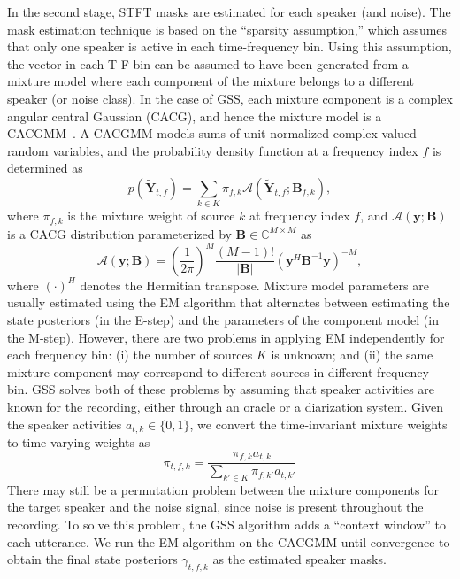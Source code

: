 \documentclass[a4paper]{article}
\begin{document}
In the second stage, STFT masks are estimated for each speaker (and noise). The mask estimation technique is based on the ``sparsity assumption,'' which assumes that only one speaker is active in each time-frequency bin. Using this assumption, the vector in each T-F bin can be assumed to have been generated from a mixture model where each component of the mixture belongs to a different speaker (or noise class). In the case of GSS, each mixture component is a complex angular central Gaussian (CACG), and hence the mixture model is a CACGMM~\cite{Ito2016ComplexAC}. A CACGMM models sums of unit-normalized complex-valued random variables, and the probability density function at a frequency index $f$ is determined as
\begin{equation}
   p(\tilde{\mathbf{Y}}_{t,f}) = \sum_{k\in K} \pi_{f,k} \mathcal{A}(\tilde{\mathbf{Y}}_{t,f};\mathbf{B}_{f,k}),
\end{equation}
where $\pi_{f,k}$ is the mixture weight of source $k$ at frequency index $f$, and $\mathcal{A}(\mathbf{y};\mathbf{B})$ is a CACG distribution parameterized by $\mathbf{B}\in \mathbb{C}^{M\times M}$ as
\begin{equation}
    \mathcal{A}(\mathbf{y};\mathbf{B}) = \left(\frac{1}{2\pi}\right)^M \frac{(M-1)!}{\lvert\mathbf{B}\rvert} (\mathbf{y}^H \mathbf{B}^{-1} \mathbf{y})^{-M},
\end{equation}
where $(\cdot)^H$ denotes the Hermitian transpose. Mixture model parameters are usually estimated using the EM algorithm that alternates between estimating the state posteriors (in the E-step) and the parameters of the component model (in the M-step). However, there are two problems in applying EM independently for each frequency bin: (i) the number of sources $K$ is unknown; and (ii) the same mixture component may correspond to different sources in different frequency bin. GSS solves both of these problems by assuming that speaker activities are known for the recording, either through an oracle or a diarization system. Given the speaker activities $a_{t,k} \in \{0,1\}$, we convert the time-invariant mixture weights to time-varying weights as
\begin{equation}
    \pi_{t,f,k} = \frac{\pi_{f,k}a_{t,k}}{\sum_{k' \in K}\pi_{f,k'}a_{t,k'}}
\end{equation}
There may still be a permutation problem between the mixture components for the target speaker and the noise signal, since noise is present throughout the recording. To solve this problem, the GSS algorithm adds a ``context window'' to each utterance. We run the EM algorithm on the CACGMM until convergence to obtain the final state posteriors $\gamma_{t,f,k}$ as the estimated speaker masks.
\end{document}
